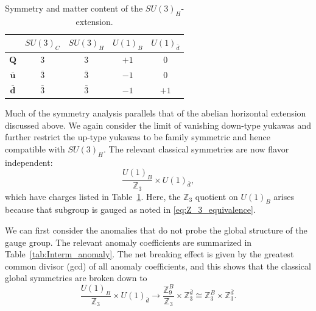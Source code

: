 \documentclass[11pt,a4paper]{article}
\def\beq{\begin{equation}}
\def\eeq{\end{equation}}
\begin{document}
\begin{table}\centering
\large
\renewcommand{\arraystretch}{1.3}
\begin{tabular}{|c|c|c|c|c|}  \hline
 & $SU(3)_C$ & $SU(3)_H$ & $U(1)_{B}$ & $U(1)_{\bar{d}}$ \\ \hline


$\mathbf{Q}$ & $3$ & $3$ & $+1$ & $0$ \\ \hline

$\mathbf{\bar u}$ & $\bar 3$ & $\bar 3$ & $-1$ & $0$ \\ \hline

$\mathbf{\bar d}$ & $\bar 3$ & $\bar 3$ & $-1$ & $+1$ \\ \hline

\end{tabular}\caption{Symmetry and matter content of the $SU(3)_H$-extension. }\label{tab:inter_charges}
\end{table}

Much of the symmetry analysis parallels that of the abelian horizontal extension discussed above.  We again consider the limit of vanishing down-type yukawas and further restrict the up-type yukawas to be family symmetric and hence compatible with $SU(3)_{H}$.  The relevant classical symmetries are now flavor independent:
\begin{equation}
\frac{U(1)_{B}}{\mathbb{Z}_{3}} \times U(1)_{\bar{d}},
\end{equation}
which have charges listed in Table~\ref{tab:inter_charges}.  Here, the $\mathbb{Z}_{3}$ quotient on $U(1)_{B}$ arises because that subgroup is gauged as noted in \eqref{eq:Z_3_equivalence}.

We can first consider the anomalies that do not probe the global structure of the gauge group.  The relevant anomaly coefficients are summarized in Table~\ref{tab:Interm_anomaly}.
The net breaking effect is given by the greatest common divisor (gcd) of all anomaly coefficients, and this shows that the classical global symmetries are broken down to
\beq
\frac{U(1)_{B}}{\mathbb{Z}_{3}} \times U(1)_{\bar{d}} \to \frac{\mathbb{Z}_9^{B}}{\mathbb{Z}_{3}} \times \mathbb{Z}_{3}^{\bar{d}}\cong \mathbb{Z}_3^{B} \times \mathbb{Z}_{3}^{\bar{d}}.
\eeq 
\end{document}

